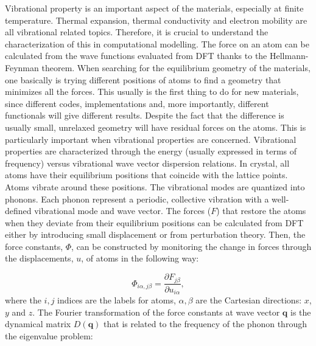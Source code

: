Vibrational property is an important aspect of the materials, especially at finite temperature. Thermal expansion, thermal conductivity and electron mobility are all vibrational related topics. Therefore, it is crucial to understand the characterization of this in computational modelling. The force on an atom can be calculated from the wave functions evaluated from DFT thanks to the Hellmann-Feynman theorem. When searching for the equilibrium geometry of the materials, one basically is trying different positions of atoms to find a geometry that minimizes all the forces. This usually is the first thing to do for new materials, since different codes, implementations and, more importantly, different functionals will give different results. Despite the fact that the difference is usually small, unrelaxed geometry will have residual forces on the atoms. This is particularly important when vibrational properties are concerned. Vibrational properties are characterized through the energy (usually expressed in terms of frequency) versus vibrational wave vector dispersion relations.  In crystal,  all atoms have their equilibrium positions that coincide with the lattice points. Atoms vibrate around these positions. The vibrational modes are quantized into phonons. Each phonon represent a periodic, collective vibration with a well-defined vibrational mode and wave vector. The forces ($F$) that restore the atoms when they deviate from their equilibrium positions can be calculated from DFT either by introducing small displacement or from perturbation theory. Then, the force constants, $\Phi$, can be constructed by monitoring the change in forces through the displacements, $u$, of atoms in the following way:

\begin{equation}
\Phi_{i\alpha,j\beta}= \frac{\partial F_{j\beta}}{\partial u_{i\alpha}},
\end{equation} 
where the $i,j$ indices are the labels for atoms, $\alpha,\beta$ are the Cartesian directions: $x$, $y$ and $z$. The Fourier transformation of the force constants at wave vector $\mathbf{q}$ is the dynamical matrix $D(\mathbf{q})$ that is related to the frequency of the phonon through the eigenvalue problem:

